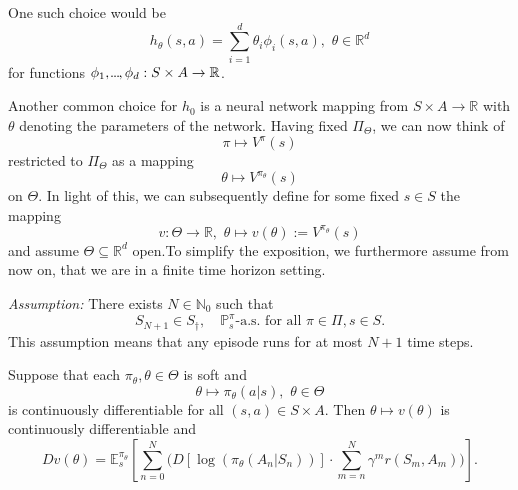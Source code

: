 One such choice would be 
\[
    h_\theta(s,a) = \sum_{i=1}^d \theta_i \phi_i(s,a), \,\, \theta \in \mathbb{R}^d
\]
for functions \( \phi_{1},\kern-0.10em.\kern-0.06em.\kern-0.06em.\kern-0.1em,\phi_d : S \times A \to \mathbb{R} \).

Another common choice for \( h_{0} \) is a neural network mapping from \( S \times A  \to \mathbb{R}\) with \( \theta \) denoting the parameters of the network. 
Having fixed \( \Pi_\Theta \), we can now think of 
\[
    \pi \mapsto V^\pi(s)
\]
restricted to \( \Pi_\Theta \) as a mapping 
\[
    \theta \mapsto V^{\pi_\theta}(s)
\] 
on \( \Theta \). In light of this, we can subsequently define for some fixed \( s \in S \) the mapping 
\[
    v: \Theta \to \mathbb{R}, \,\, \theta \mapsto v(\theta) := V^{\pi_\theta}(s)
\]
and assume \( \Theta \subseteq \mathbb{R}^d \) open.To simplify the exposition, we furthermore assume from now on, that we are in a finite time horizon setting.


\emph{Assumption:} There exists \( N \in \mathbb{N}_{0} \) such that 
\[
    S_{N+1} \in S_\dagger, \quad \mathbb{P}_s^\pi\text{-a.s.} \text{ for all } \pi \in \Pi, s \in S.
\]
This assumption means that any episode runs for at most 
\( N + 1 \) time steps.

\begin{theorem}\label{thm_policy_gradients}
Suppose that each \( \pi_\theta, \theta \in \Theta\) is soft and
\[
    \theta \mapsto \pi_\theta(a|s), \,\, \theta \in \Theta
\]
is continuously differentiable for all \( (s,a) \in S \times A \). 
Then \( \theta \mapsto v(\theta) \) is continuously differentiable and
\[
    Dv(\theta) = \mathbb{E}_s^{\pi_\theta} \left[ \sum_{n = 0}^N \big( D \left[ \log(\pi_\theta(A_n | S_n)) \right] \cdot \sum_{m = n}^N \gamma^m r(S_m, A_m)\big) \right].
\]
\end{theorem}

